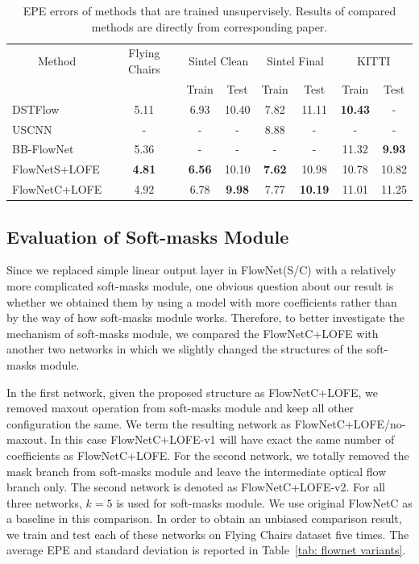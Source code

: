 \documentclass[10pt,twocolumn,letterpaper]{article}
\begin{document}
\begin{table}[]
\centering
\caption{EPE errors of methods that are trained unsupervisely. Results of compared methods are directly from corresponding paper.}
\label{tab: results unsupervised}
\begin{tabular}{lccccccc}
\hline
\hline
\multicolumn{1}{c}{Method} & Flying Chairs & \multicolumn{2}{c}{Sintel Clean} & \multicolumn{2}{c}{Sintel Final} & \multicolumn{2}{c}{KITTI}      \\
                           &               & Train           & Test           & Train          & Test            & Train          & Test          \\ \hline
DSTFlow                    & 5.11          & 6.93            & 10.40          & 7.82           & 11.11           & \textbf{10.43} & -             \\
USCNN                      & -             & -               & -              & 8.88           & -               & -              & -             \\
BB-FlowNet                 & 5.36          & -               & -              & -              & -               & 11.32          & \textbf{9.93} \\
FlowNetS+LOFE              & \textbf{4.81} & \textbf{6.56}   & 10.10          & \textbf{7.62}  & 10.98           & 10.78          & 10.82         \\
FlowNetC+LOFE              & 4.92          & 6.78            & \textbf{9.98}  & 7.77           & \textbf{10.19}  & 11.01          & 11.25         \\ \hline
\end{tabular}
\end{table}

\subsection{Evaluation of Soft-masks Module}
Since we replaced simple linear output layer in FlowNet(S/C) with a relatively more complicated soft-masks module, one obvious question about our result is whether we obtained them by using a model with more coefficients rather than by the way of how soft-masks module works. Therefore, to better investigate the mechanism of soft-masks module, we compared the FlowNetC+LOFE with another two networks in which we slightly changed the structures of the soft-masks module.

In the first network, given the proposed structure as FlowNetC+LOFE, we removed maxout operation from soft-masks module and keep all other configuration the same. We term the resulting network as FlowNetC+LOFE/no-maxout. In this case FlowNetC+LOFE-v1 will have exact the same number of coefficients as FlowNetC+LOFE. For the second network, we totally removed the mask branch from soft-masks module and leave the intermediate optical flow branch only. The second network is denoted as FlowNetC+LOFE-v2. For all three networks, $k=5$ is used for soft-masks module. We use original FlowNetC as a baseline in this comparison. In order to obtain an unbiased comparison result, we train and test each of these networks on Flying Chairs dataset five times. The average EPE and standard deviation is reported in Table~\ref{tab: flownet variants}.
\end{document}
